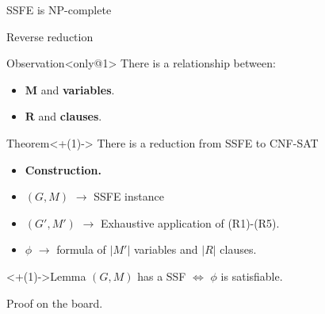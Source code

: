 \documentclass{beamer}
\begin{document}
\begin{frame}[t]{SSFE is NP-complete}
{
	}

\end{frame}

\begin{frame}[t]{Reverse reduction}
	\begin{block}{Observation}<only@1>
		There is a relationship between:
		\setlength{\leftmargini}{20pt}
		\begin{itemize}
			\item $\mathbf{M}$ and \textbf{variables}.
			\item $\mathbf{R}$ and \textbf{clauses}.
		\end{itemize}
	\end{block}

	\begin{block}{Theorem}<+(1)->
		There is a reduction from SSFE to CNF-SAT
	\end{block}
	\small
	\begin{itemize}[<+(1)->]
		\item[] \textbf{Construction.}
		\item[] $(G,M)$ $\rightarrow$ SSFE instance
		\item[] $(G',M')$ $\rightarrow$ Exhaustive application of (R1)-(R5).
		\item[] $\phi$ $\rightarrow$ formula of $|M'|$ variables and $|R|$ clauses.
	\end{itemize}

	\begin{block}<+(1)->{Lemma}
		$(G,M)$ has a SSF $\iff$ $\phi$ is satisfiable.
	\end{block}

	\onslide <+-> { Proof on the board.}
\end{frame}
\end{document}
